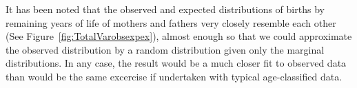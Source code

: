 
It has been noted that the observed and expected distributions of births by
remaining years of life of mothers and fathers very closely resemble each other
(See Figure~\ref{fig:TotalVarobsexpex}), almost enough so that we could
approximate the observed distribution by a random distribution given only the
marginal distributions. In any case, the result would be a much closer fit to
observed data than would be the same excercise if undertaken with typical
age-classified data.









